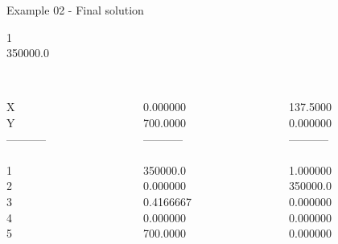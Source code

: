 \begin{frame}{Example 02 - Final solution}

  1\\
  350000.0\\

\begin{columns}[t]
\begin{column}{0.3\textwidth}
\\
X\\
Y\\
-----------\\
\\
1\\
2\\
3\\
4\\
5\\

\end{column}
\begin{column}{0.3\textwidth}
\\
0.000000\\
700.0000\\

-----------\\
\\
350000.0\\
0.000000\\
0.4166667\\
0.000000\\
700.0000\\

\end{column}  

\begin{column}{0.3\textwidth}
\\
137.5000\\
0.000000\\
-----------\\
\\
1.000000\\
350000.0\\
0.000000\\
0.000000\\
0.000000\\

\end{column}  
\end{columns}

\end{frame}
